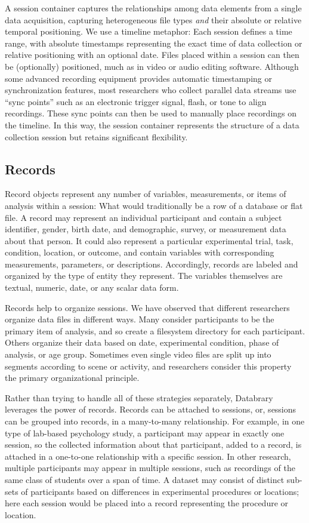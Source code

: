 \documentclass{sig-alternate}
\begin{document}
A session container captures the relationships among data elements from a single data acquisition, capturing heterogeneous file types \emph{and} their absolute or relative temporal positioning.
We use a timeline metaphor: Each session defines a time range, with absolute timestamps representing the exact time of data collection or relative positioning with an optional date.
Files placed within a session can then be (optionally) positioned, much as in video or audio editing software.
Although some advanced recording equipment provides automatic timestamping or synchronization features, most researchers who collect parallel data streams use ``sync points'' such as an electronic trigger signal, flash, or tone to align recordings.
These sync points can then be used to manually place recordings on the timeline.
In this way, the session container represents the structure of a data collection session but retains significant flexibility.

\subsection{Records}

Record objects represent any number of variables, measurements, or items of analysis within a session: What would traditionally be a row of a database or flat file.
A record may represent an individual participant and contain a subject identifier, gender, birth date, and demographic, survey, or measurement data about that person.
It could also represent a particular experimental trial, task, condition, location, or outcome, and contain variables with corresponding measurements, parameters, or descriptions.
Accordingly, records are labeled and organized by the type of entity they represent.
The variables themselves are textual, numeric, date, or any scalar data form.

Records help to organize sessions.
We have observed that different researchers organize data files in different ways.
Many consider participants to be the primary item of analysis, and so create a filesystem directory for each participant.
Others organize their data based on date, experimental condition, phase of analysis, or age group.
Sometimes even single video files are split up into segments according to scene or activity, and researchers consider this property the primary organizational principle.

Rather than trying to handle all of these strategies separately, Databrary leverages the power of records.
Records can be attached to sessions, or, sessions can be grouped into records, in a many-to-many relationship.
For example, in one type of lab-based psychology study, a participant may appear in exactly one session, so the collected information about that participant, added to a record, is attached in a one-to-one relationship with a specific session.
In other research, multiple participants may appear in multiple sessions, such as recordings of the same class of students over a span of time.
A dataset may consist of distinct sub-sets of participants based on differences in experimental procedures or locations; here each session would be placed into a record representing the procedure or location.
\end{document}
